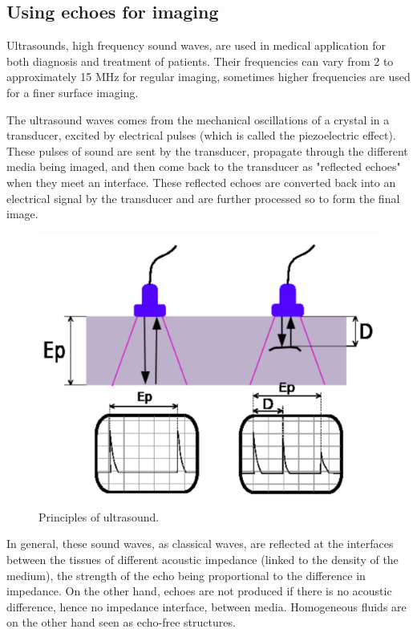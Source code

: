 \documentclass[letterpaper, 10 pt, conference]{ieeeconf} %
\begin{document}
\subsection{Using echoes for imaging}

Ultrasounds, high frequency sound waves, are used in medical application for both diagnosis and treatment of patients. Their frequencies can vary from 2 to approximately 15 MHz for regular imaging, sometimes higher frequencies are used for a finer surface imaging.

The ultrasound waves comes from the mechanical oscillations of a crystal in a transducer, excited by electrical pulses (which is called the piezoelectric effect). These pulses of sound are sent by the transducer, propagate through the different media being imaged, and then come back to the transducer as "reflected echoes" when they meet an interface. These reflected echoes are converted back into an electrical signal by the transducer and are further processed so to form the final image.

\begin{figure}%
\centering
\includegraphics[width=.8\linewidth]{principles.pdf}
\caption{Principles of ultrasound.}
\end{figure}


In general, these sound waves, as classical waves, are reflected at the interfaces between the tissues of different acoustic impedance (linked to the density of the medium), the strength of the echo being proportional to the difference in impedance. On the other hand, echoes are not produced if there is no acoustic difference, hence no impedance interface, between media. Homogeneous fluids are on the other hand seen as echo-free structures.
\end{document}
